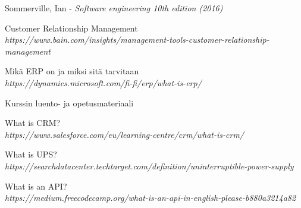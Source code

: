 \begin{thebibliography}{9}

 Sommerville, Ian - \textit{Software engineering 10th edition (2016)}

Customer Relationship Management
\\\textit{https://www.bain.com/insights/management-tools-customer-relationship-management}

Mikä ERP on ja miksi sitä tarvitaan
\\\textit{https://dynamics.microsoft.com/fi-fi/erp/what-is-erp/}

Kurssin luento- ja opetusmateriaali

What is CRM?
\\\textit{https://www.salesforce.com/eu/learning-centre/crm/what-is-crm/}

What is UPS?
\\\textit{https://searchdatacenter.techtarget.com/definition/uninterruptible-power-supply}

What is an API?
\\\textit{https://medium.freecodecamp.org/what-is-an-api-in-english-please-b880a3214a82}

\end{thebibliography}
